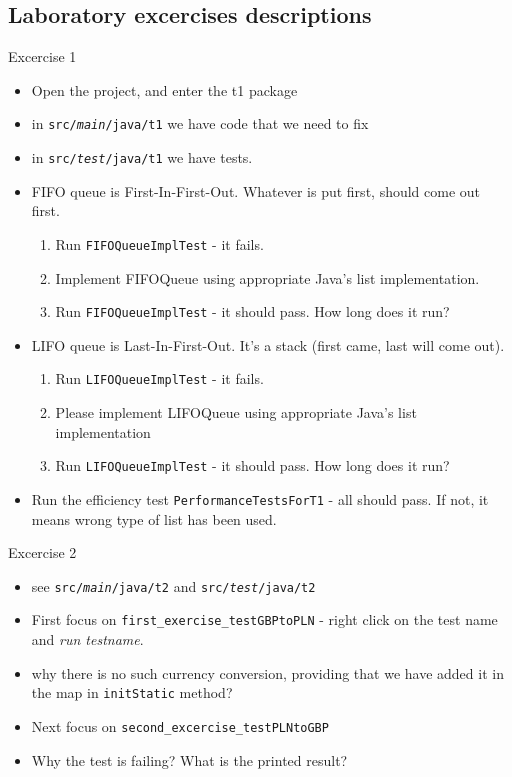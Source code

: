 \documentclass{beamer}
\begin{document}
\subsection{Laboratory excercises descriptions}


\begin{frame}[fragile]{Excercise 1}

\begin{itemize}
	\item Open the project, and enter the t1 package
    \item in \texttt{src/\textit{main}/java/t1} we have code that we need to fix
    \item in \texttt{src/\textit{test}/java/t1} we have tests. \pause
    \item FIFO queue is First-In-First-Out. Whatever is put first, should come out first. \pause
    \begin{enumerate}
        \item Run \texttt{FIFOQueueImplTest} - it fails.\pause
        \item Implement FIFOQueue using appropriate Java's list implementation.\pause
        \item Run \texttt{FIFOQueueImplTest} - it should pass. How long does it run?\pause
    \end{enumerate}
    \item LIFO queue is Last-In-First-Out. It's a stack (first came, last will come out).\pause
    \begin{enumerate}
        \item Run \texttt{LIFOQueueImplTest} - it fails.\pause
        \item Please implement LIFOQueue using appropriate Java's list implementation\pause
        \item Run \texttt{LIFOQueueImplTest} - it should pass. How long does it run?\pause
    \end{enumerate}
    \item Run the efficiency test \texttt{PerformanceTestsForT1} - all should pass. If not, it means wrong type of list has been used.
\end{itemize}
\end{frame}

\begin{frame}{Excercise 2}

\begin{itemize}
    \item see \texttt{src/\textit{main}/java/t2} and \texttt{src/\textit{test}/java/t2}
    \item First focus on \texttt{first\_exercise\_testGBPtoPLN} - right click on the test name and \textit{run testname}. \pause
    \item why there is no such currency conversion, providing that we have added it in the map in \texttt{initStatic} method? \pause
    \item Next focus on \texttt{second\_excercise\_testPLNtoGBP}\pause
    \item Why the test is failing? What is the printed result?
\end{itemize}
\end{frame}
\end{document}
